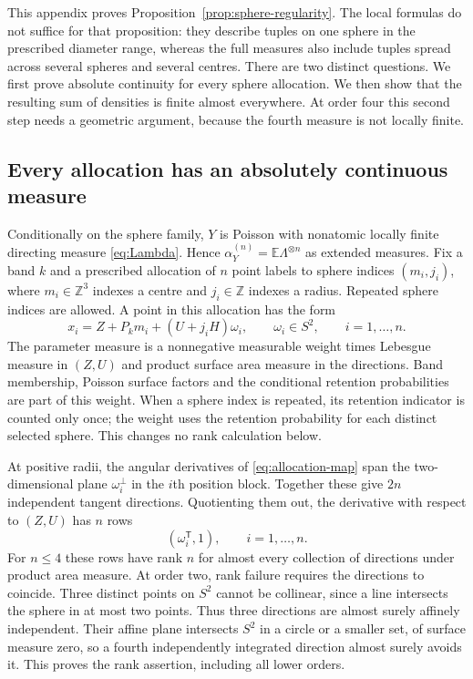 \documentclass[11pt,a4paper]{article}
\numberwithin{equation}{section}
\theoremstyle{definition}
\theoremstyle{remark}
\newcommand{\E}{\mathbb E}
\begin{document}
This appendix proves Proposition~\ref{prop:sphere-regularity}. The local
formulas do not suffice for that proposition: they describe tuples on
one sphere in the prescribed diameter range, whereas the full measures
also include tuples spread across several spheres and several centres.
There are two distinct questions. We first prove absolute continuity for
every sphere allocation. We then show that the resulting sum of densities
is finite almost everywhere. At order four this second step needs a
geometric argument, because the fourth measure is not locally finite.

\subsection{Every allocation has an absolutely continuous measure}
\label{app:submersion}

Conditionally on the sphere family, $Y$ is Poisson with nonatomic locally
finite directing measure \eqref{eq:Lambda}. Hence
$\alpha_Y^{(n)}=\E\Lambda^{\otimes n}$ as extended measures. Fix a band
$k$ and a prescribed allocation of $n$ point labels to sphere indices
$(m_i,j_i)$, where $m_i\in\mathbb Z^3$ indexes a centre and
$j_i\in\mathbb Z$ indexes a radius. Repeated sphere indices are allowed.
A point in this allocation has the form
\begin{equation}
 x_i=Z+P_km_i+(U+j_iH)\omega_i,
 \qquad\omega_i\in S^2,\qquad i=1,\ldots,n.
 \label{eq:allocation-map}
\end{equation}
The parameter measure is a nonnegative measurable weight times Lebesgue
measure in $(Z,U)$ and product surface area measure in the directions.
Band membership, Poisson surface factors and the conditional retention
probabilities are part of this weight. When a sphere index is repeated,
its retention indicator is counted only once; the weight uses the
retention probability for each distinct selected sphere. This changes
no rank calculation below.

At positive radii, the angular derivatives of
\eqref{eq:allocation-map} span the two-dimensional plane
$\omega_i^\perp$ in the $i$th position block. Together these give $2n$
independent tangent directions. Quotienting them out, the derivative with
respect to $(Z,U)$ has $n$ rows
\begin{equation}
 (\omega_i^{\mathsf T},1),\qquad i=1,\ldots,n.
 \label{eq:normal-rows}
\end{equation}
For $n\leq4$ these rows have rank $n$ for almost every collection of
directions under product area measure. At order two, rank failure
requires the directions to coincide. Three distinct points on $S^2$
cannot be collinear, since a line intersects the sphere in at most two
points. Thus three directions are almost surely affinely independent.
Their affine plane intersects $S^2$ in a circle or a smaller set, of
surface measure zero, so a fourth independently integrated direction
almost surely avoids it. This proves the rank assertion, including all
lower orders.
\end{document}
